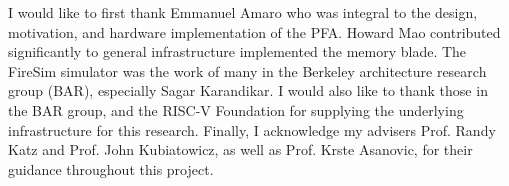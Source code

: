 I would like to first thank Emmanuel Amaro who was integral to the design,
motivation, and hardware implementation of the PFA. Howard Mao contributed
significantly to general infrastructure implemented the memory blade. The
FireSim simulator was the work of many in the Berkeley architecture research
group (BAR), especially Sagar Karandikar. I would also like to thank those in
the BAR group, and the RISC-V Foundation for supplying the underlying
infrastructure for this research.  Finally, I acknowledge my advisers Prof.
Randy Katz and Prof. John Kubiatowicz, as well as Prof. Krste Asanovic, for
their guidance throughout this project. 

